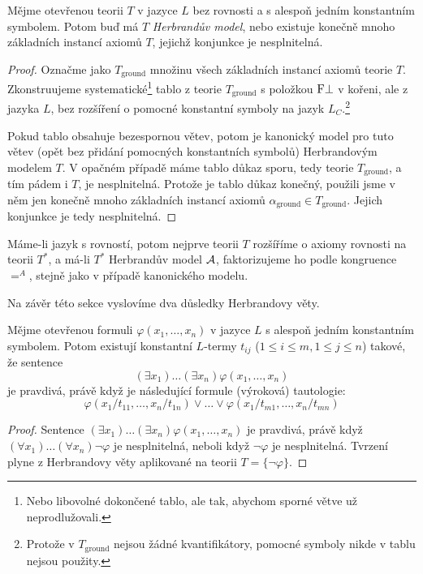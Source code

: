 \begin{theorem}
Mějme otevřenou teorii $T$ v jazyce $L$ bez rovnosti a s alespoň jedním konstantním symbolem. Potom buď má $T$ \emph{Herbrandův model}, nebo existuje konečně mnoho základních instancí axiomů $T$, jejichž konjunkce je nesplnitelná.
\end{theorem}
\begin{proof}
Označme jako $T_\text{ground}$ množinu všech základních instancí axiomů teorie $T$. Zkonstruujeme systematické\footnote{Nebo libovolné dokončené tablo, ale tak, abychom sporné větve už neprodlužovali.} tablo z teorie $T_\text{ground}$ s položkou $\mathrm{F}\bot$ v kořeni, ale z jazyka $L$, bez rozšíření o pomocné konstantní symboly na jazyk $L_C$.\footnote{Protože v $T_\text{ground}$ nejsou žádné kvantifikátory, pomocné symboly nikde v tablu nejsou použity.}

Pokud tablo obsahuje bezespornou větev, potom je kanonický model pro tuto větev (opět bez přidání pomocných konstantních symbolů) Herbrandovým modelem $T$. V opačném případě máme tablo důkaz sporu, tedy teorie $T_\text{ground}$, a tím pádem i $T$, je nesplnitelná. Protože je tablo důkaz konečný, použili jsme v něm jen konečně mnoho základních instancí axiomů $\alpha_\text{ground}\in T_\text{ground}$. Jejich konjunkce je tedy nesplnitelná.
\end{proof}

\begin{remark}\label{remark:herbrand-theorem-equality}
Máme-li jazyk s rovností, potom nejprve teorii $T$ rozšíříme o axiomy rovnosti na teorii $T^*$, a má-li $T^*$ Herbrandův model $\mathcal{A}$, faktorizujeme ho podle kongruence $=^A$, stejně jako v případě kanonického modelu.
\end{remark}

Na závěr této sekce vyslovíme dva důsledky Herbrandovy věty.

\begin{corollary}
    Mějme otevřenou formuli $\varphi(x_1,\dots,x_n)$ v jazyce $L$ s alespoň jedním konstantním symbolem. Potom existují konstantní $L$-termy $t_{ij}$ ($1\leq i\leq m,1\leq j\leq n$) takové, že sentence 
    $$
    (\exists x_1)\dots(\exists x_n)\varphi(x_1,\dots,x_n)$$ 
    je pravdivá, právě když je následující formule (výroková) tautologie:
    $$
    \varphi(x_1/t_{11},\dots,x_n/t_{1n})\lor \dots \lor \varphi(x_1/t_{m1},\dots,x_n/t_{mn})
    $$
\end{corollary}
\begin{proof}
Sentence $(\exists x_1)\dots(\exists x_n)\varphi(x_1,\dots,x_n)$ je pravdivá, právě když $(\forall x_1)\dots(\forall x_n)\neg\varphi$ je nesplnitelná, neboli když $\neg\varphi$ je nesplnitelná. Tvrzení plyne z Herbrandovy věty aplikované na teorii $T=\{\neg\varphi\}$.
\end{proof}

